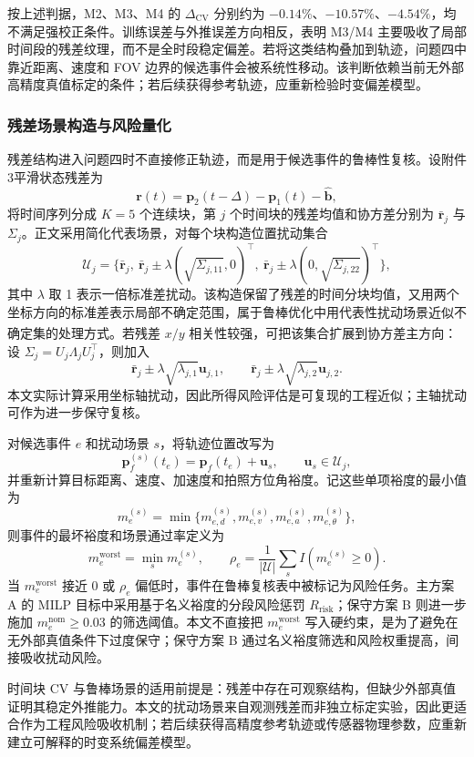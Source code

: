 \documentclass{cumcmthesis}
\newcommand{\upcite}[1]{\textsuperscript{\cite{#1}}}
\begin{document}
按上述判据，M2、M3、M4 的 $\Delta_{\mathrm{CV}}$ 分别约为 $-0.14\%$、$-10.57\%$、$-4.54\%$，均不满足强校正条件。训练误差与外推误差方向相反，表明 M3/M4 主要吸收了局部时间段的残差纹理，而不是全时段稳定偏差。若将这类结构叠加到轨迹，问题四中靠近距离、速度和 FOV 边界的候选事件会被系统性移动。该判断依赖当前无外部高精度真值标定的条件；若后续获得参考轨迹，应重新检验时变偏差模型。

\subsubsection{残差场景构造与风险量化}
残差结构进入问题四时不直接修正轨迹，而是用于候选事件的鲁棒性复核。设附件3平滑状态残差为
\[
  \bm r(t)=\bm p_2(t-\Delta)-\bm p_1(t)-\hat{\bm b},
\]
将时间序列分成 $K=5$ 个连续块，第 $j$ 个时间块的残差均值和协方差分别为 $\bar{\bm r}_j$ 与 $\Sigma_j$。正文采用简化代表场景，对每个块构造位置扰动集合
\[
  \mathcal U_j=\{\bar{\bm r}_j,\ \bar{\bm r}_j\pm \lambda(\sqrt{\Sigma_{j,11}},0)^\top,\ 
  \bar{\bm r}_j\pm \lambda(0,\sqrt{\Sigma_{j,22}})^\top\},
\]
其中 $\lambda$ 取 1 表示一倍标准差扰动。该构造保留了残差的时间分块均值，又用两个坐标方向的标准差表示局部不确定范围，属于鲁棒优化中用代表性扰动场景近似不确定集的处理方式\upcite{bertsimas}。若残差 $x/y$ 相关性较强，可把该集合扩展到协方差主方向：设 $\Sigma_j=U_j\Lambda_jU_j^\top$，则加入
\[
  \bar{\bm r}_j\pm\lambda\sqrt{\lambda_{j,1}}\bm u_{j,1},\qquad
  \bar{\bm r}_j\pm\lambda\sqrt{\lambda_{j,2}}\bm u_{j,2}.
\]
本文实际计算采用坐标轴扰动，因此所得风险评估是可复现的工程近似；主轴扰动可作为进一步保守复核。

对候选事件 $e$ 和扰动场景 $s$，将轨迹位置改写为
\[
  \bm p_f^{(s)}(t_e)=\bm p_f(t_e)+\bm u_s,\qquad \bm u_s\in \mathcal U_j,
\]
并重新计算目标距离、速度、加速度和拍照方位角裕度。记这些单项裕度的最小值为
\[
  m_e^{(s)}=\min\{m_{e,d}^{(s)},m_{e,v}^{(s)},m_{e,a}^{(s)},m_{e,\theta}^{(s)}\},
\]
则事件的最坏裕度和场景通过率定义为
\[
  m_e^{\mathrm{worst}}=\min_s m_e^{(s)},\qquad
  \rho_e=\frac{1}{|\mathcal U|}\sum_s I(m_e^{(s)}\ge0).
\]
当 $m_e^{\mathrm{worst}}$ 接近 0 或 $\rho_e$ 偏低时，事件在鲁棒复核表中被标记为风险任务。主方案 A 的 MILP 目标中采用基于名义裕度的分段风险惩罚 $R_{\mathrm{risk}}$；保守方案 B 则进一步施加 $m_e^{\mathrm{nom}}\ge 0.03$ 的筛选阈值。本文不直接把 $m_e^{\mathrm{worst}}$ 写入硬约束，是为了避免在无外部真值条件下过度保守；保守方案 B 通过名义裕度筛选和风险权重提高，间接吸收扰动风险。

时间块 CV 与鲁棒场景的适用前提是：残差中存在可观察结构，但缺少外部真值证明其稳定外推能力。本文的扰动场景来自观测残差而非独立标定实验，因此更适合作为工程风险吸收机制；若后续获得高精度参考轨迹或传感器物理参数，应重新建立可解释的时变系统偏差模型。
\end{document}

